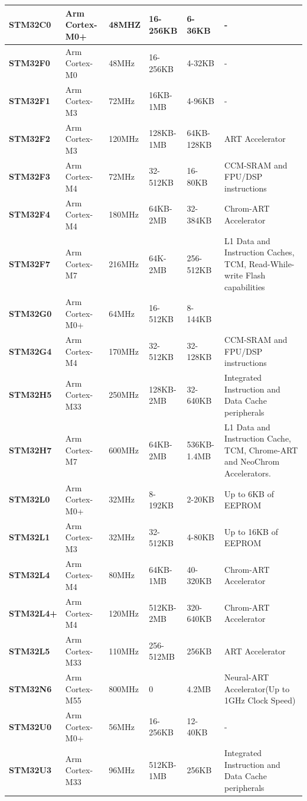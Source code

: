 \begin{xltabular}{\linewidth}{@{}>{\bfseries}l X@{} X@{} X@{} X@{} X@{}}
	STM32C0 &
	Arm Cortex-M0+ &
	48MHZ & 16-256KB & 6-36KB & - \\
	\midrule
	STM32F0 &
	Arm Cortex-M0 &
	48MHz & 16-256KB & 4-32KB & - \\
	\midrule
	STM32F1 &
	Arm Cortex-M3 &
	72MHz & 16KB-1MB & 4-96KB & - \\
	\midrule
	STM32F2 &
	Arm Cortex-M3 &
	120MHz & 128KB-1MB & 64KB-128KB & ART Accelerator \\
	\midrule
	STM32F3 &
	Arm Cortex-M4 &
	72MHz & 32-512KB & 16-80KB & CCM-SRAM and FPU/DSP instructions \\
	\midrule
	STM32F4 &
	Arm Cortex-M4 &
	180MHz & 64KB-2MB & 32-384KB & Chrom-ART Accelerator\\
	\midrule
	STM32F7 &
	Arm Cortex-M7 &
	216MHz & 64K-2MB & 256-512KB & L1 Data and Instruction Caches, TCM, Read-While-write Flash capabilities \\
	\midrule
	STM32G0 &
	Arm Cortex-M0+ &
	64MHz & 16-512KB & 8-144KB & \\
	\midrule
	STM32G4 &
	Arm Cortex-M4 &
	170MHz & 32-512KB & 32-128KB & CCM-SRAM and FPU/DSP instructions \\
	\midrule
	STM32H5 &
	Arm Cortex-M33 &
	250MHz & 128KB-2MB & 32-640KB & Integrated Instruction and Data Cache peripherals \\
	\midrule
	STM32H7 &
	Arm Cortex-M7 &
	600MHz & 64KB-2MB & 536KB-1.4MB & L1 Data and Instruction Cache, TCM, Chrome-ART and NeoChrom Accelerators.  \\
	\midrule
	STM32L0 &
	Arm Cortex-M0+ &
	32MHz & 8-192KB & 2-20KB & Up to 6KB of EEPROM \\
	\midrule
	STM32L1 &
	Arm Cortex-M3 &
	32MHz & 32-512KB & 4-80KB & Up to 16KB of EEPROM \\
	\midrule
	STM32L4 &
	Arm Cortex-M4 &
	80MHz & 64KB-1MB & 40-320KB & Chrom-ART Accelerator \\
	\midrule
	STM32L4+ &
	Arm Cortex-M4 &
	120MHz & 512KB-2MB & 320-640KB & Chrom-ART Accelerator \\
	\midrule
	STM32L5 &
	Arm Cortex-M33 &
	110MHz & 256-512MB & 256KB & ART Accelerator \\
	\midrule
	STM32N6 &
	Arm Cortex-M55 &
	800MHz & 0 & 4.2MB & Neural-ART Accelerator(Up to 1GHz Clock Speed) \\
	\midrule
	STM32U0 &
	Arm Cortex-M0+ &
	56MHz & 16-256KB & 12-40KB & - \\
	\midrule
	STM32U3 &
	Arm Cortex-M33 &
	96MHz & 512KB-1MB & 256KB & Integrated Instruction and Data Cache peripherals \\

\end{xltabular}
